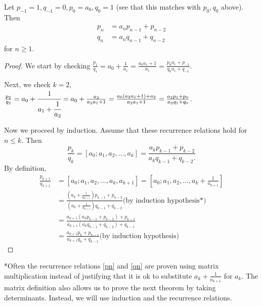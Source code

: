 \documentclass{ximera}
\begin{document}
\begin{theorem}
 Let $p_{-1}=1, q_{-1}=0, p_0=a_0, q_0=1$ (see that this matches with $p_0,q_0$ above). Then 
\begin{align}
 p_n&=a_np_{n-1}+p_{n-2}\label{pn}\\
 q_n&=a_nq_{n-1}+q_{n-2}\label{qn}
\end{align}
for $n\geq 1$.
\end{theorem}
\begin{proof}
 We start by checking $\frac{p_1}{q_1}=a_0+\frac{1}{a_1}=\frac{a_0a_1+1}{a_1}=\frac{p_0a_1+p_{-1}}{q_0a_1+q_{-1}}$. 
 
Next, we check $k=2$, $\frac{p_2}{q_2}=a_0+\cfrac{1}{a_1+\cfrac{1}{a_2}}=a_0+\frac{a_2}{a_2a_1+1}=\frac{a_0(a_2a_1+1)+a_2}{a_2a_1+1}=\frac{a_2p_1+p_0}{a_2q_1+q_0}$. 

 Now we proceed by induction. Assume that these recurrence relations hold for $n\leq k$. Then \[\frac{p_k}{q_k}=[a_0;a_1,a_2,\dots,a_k]=\frac{a_k p_{k-1}+p_{k-2}}{a_k q_{k-1}+q_{k-2}.}\]
 By definition, 
\begin{align*}
 \frac{p_{k+1}}{q_{k+1}}&=[a_0;a_1,a_2,\dots,a_k,a_{k+1}]=[a_0;a_1,a_2,\dots,a_k+\frac{1}{a_{k+1}}]\\
&=\frac{\left(a_k+\frac{1}{a_{k+1}}\right)p_{k-1}+p_{k-2}}{\left(a_k+\frac{1}{a_{k+1}}\right) q_{k-1}+q_{k-2}} \textrm{(by induction hypothesis*)}\\
&=\frac{{a_{k+1}}\left(a_kp_{k-1}+p_{k-2}\right)+p_{k-1}}{a_{k+1}\left(a_kq_{k-1}+{q_{k-2}}\right) +q_{k-1}}\\
&=\frac{{a_{k+1}}p_k+p_{k-1}}{a_{k+1}q_k +q_{k-1}}\textrm{(by induction hypothesis)}
\end{align*}
\end{proof}
*Often the recurrence relations \eqref{pn} and \eqref{qn} are proven using matrix multiplication instead of justifying that it is ok to substitute $a_k+\frac{1}{a_{k+1}}$ for $a_k$. The matrix definition also allows us to prove the next theorem by taking determinants. Instead, we will use induction and the recurrence relations.
\end{document}
